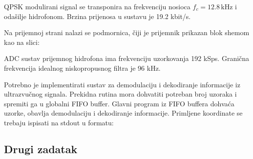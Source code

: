 \documentclass[a4paper]{article}
\begin{document}
\begin{figure}[h!]
\centering
{}
\end{figure}

QPSK modulirani signal se transponira na frekvenciju nosioca $f_c = 12.8 \,\textrm{kHz}$ i odašilje hidrofonom. Brzina prijenosa u sustavu je 19.2 kbit/s.

Na prijemnoj strani nalazi se podmornica, čiji je prijemnik prikazan blok shemom kao na slici:

\begin{figure}[h!]
\centering
\begin{tikzpicture}
\end{tikzpicture}
\end{figure}

ADC sustav prijemnog hidrofona ima frekvenciju uzorkovanja 192 kSps. Granična frekvencija idealnog niskopropusnog filtra je 96 kHz.

Potrebno je implementirati sustav za demodulaciju i dekodiranje informacije iz ultrazvučnog signala. Prekidna rutina mora dohvatiti potreban broj uzoraka i spremiti ga u globalni FIFO buffer. Glavni program iz FIFO buffera dohvaća uzorke, obavlja demodulaciju i dekodiranje informacije. Primljene koordinate se trebaju ispisati na stdout u formatu:

\subsection{Drugi zadatak}
\end{document}
